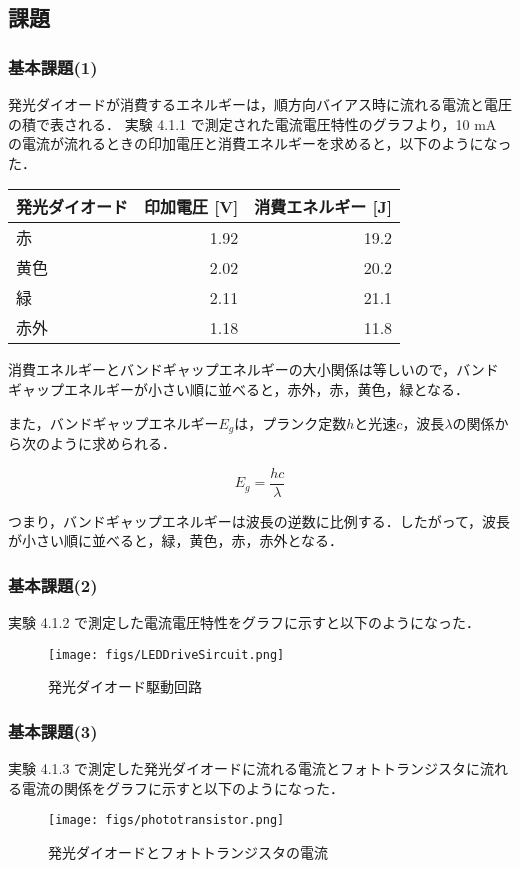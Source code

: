 \documentclass{ltjsarticle}
\begin{document}
\subsection{課題}
\subsubsection{基本課題(1)}
発光ダイオードが消費するエネルギーは，順方向バイアス時に流れる電流と電圧の積で表される．
実験 4.1.1 で測定された電流電圧特性のグラフより，10 mA の電流が流れるときの印加電圧と消費エネルギーを求めると，以下のようになった．
\begin{table}[H]
  \centering
  \begin{tabular}{|l|r|r|}
    \hline
    発光ダイオード & 印加電圧 [V] & 消費エネルギー [J] \\
    \hline
    赤 & 1.92 & 19.2 \\
    黄色 & 2.02 & 20.2 \\
    緑 & 2.11 & 21.1 \\
    赤外 & 1.18 & 11.8 \\
    \hline
  \end{tabular}
\end{table}
消費エネルギーとバンドギャップエネルギーの大小関係は等しいので，バンドギャップエネルギーが小さい順に並べると，赤外，赤，黄色，緑となる．

また，バンドギャップエネルギー${E_g}$は，プランク定数${h}$と光速${c}$，波長${\lambda}$の関係から次のように求められる．

\begin{equation}
  E_g = \frac{hc}{\lambda}
\end{equation}

つまり，バンドギャップエネルギーは波長の逆数に比例する．したがって，波長が小さい順に並べると，緑，黄色，赤，赤外となる．

\subsubsection{基本課題(2)}
実験 4.1.2 で測定した電流電圧特性をグラフに示すと以下のようになった．
\begin{figure}[H]
  \centering
  \texttt{[image: figs/LEDDriveSircuit.png]}
  \caption{発光ダイオード駆動回路}
\end{figure}

\subsubsection{基本課題(3)}
実験 4.1.3 で測定した発光ダイオードに流れる電流とフォトトランジスタに流れる電流の関係をグラフに示すと以下のようになった．
\begin{figure}[H]
  \centering
  \texttt{[image: figs/phototransistor.png]}
  \caption{発光ダイオードとフォトトランジスタの電流}
\end{figure}
\end{document}
